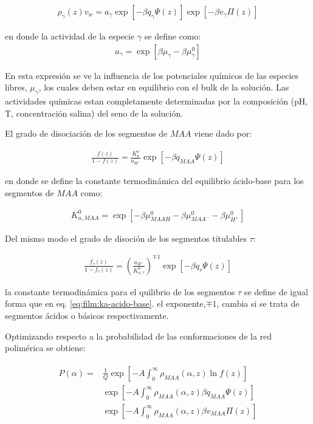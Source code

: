 \begin{align}
	\rho_\gamma(z)v_w = a_\gamma \exp\left[-\beta q_\gamma\Psi(z)\right] \exp\left[-\beta v_\gamma\Pi(z)\right]
	\label{eq:film:free-species}
\end{align}

\noindent en donde la actividad de la especie $\gamma$ se define como:
\begin{align}
	a_\gamma = \exp[\beta\mu_\gamma - \beta\mu^0_\gamma]
\end{align}

En esta expresi\'on se ve la influencia de los potenciales qu\'imicos de las especies libres,  $\mu_\gamma$, los cuales  deben estar en equilibrio con el bulk de la soluci\'on. Las actividades qu\'imicas estan completamente determinadas por la composici\'on (pH, T, concentraci\'on salina) del seno de la soluci\'on.
 
El grado de disociaci\'on de los segmentos de $MAA$ viene dado por:

\begin{align}
	\frac{f(z)}{1-f(z)} = \frac{K^0_a}{a_{H^+}} \exp[-\beta q_{MAA}\Psi(z)]
	\label{eq:film:degree-film}
\end{align}

\noindent en donde se define la constante termodin\'amica del equilibrio \'acido-base para los segmentos de $MAA$ como:

\begin{align}
	K_{a,MAA}^0 = \exp[-\beta\mu^0_{MAAH} -\beta\mu^0_{MAA^-} -\beta\mu^0_{H^+}]
	\label{eq:film:ka-acido-base}
\end{align}

Del mismo modo el grado de disoci\'on de los segmentos titulables $\tau$:

\begin{align}
	\frac{f_\tau(z)}{1-f_\tau(z)} = \left(\frac{a_{H^+}}{K^0_{a,\tau}}\right)^{\mp 1} \exp[-\beta q_\tau \Psi(z)]
	\label{eq:film:degree-protein}
\end{align}


\noindent la constante termodin\'amica para el quilibrio de los segmentos $\tau$ se define de igual forma que en eq. \ref{eq:film:ka-acido-base}. el exponente,$\mp 1$, cambia si se trata de segmentos \'acidos o b\'asicos respectivamente.

Optimizando respecto a la probabilidad de las conformaciones de la red polim\'erica se obtiene:

\begin{align}
	\begin{aligned}
	P(\alpha) = &\frac{1}{Q}\exp\left[ -A \int^\infty_0 \rho_{MAA}(\alpha, z) \ln f(z)\right] \\
	&\exp\left[ -A \int^\infty_0 \rho_{MAA}(\alpha, z) \beta q_{MAA} \Psi(z)\right] \\
	& \exp\left[ -A \int^\infty_0 \rho_{MAA}(\alpha, z) \beta v_{MAA} \Pi(z)\right] 
	\end{aligned}
	\label{eq:film:probabilidad}
\end{align}

